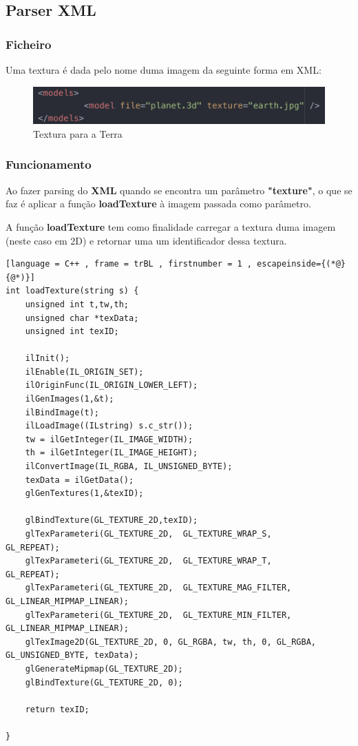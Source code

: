\documentclass[a4paper]{article}
\begin{document}
\subsection{Parser XML}
\label{sec:parsert}

\subsubsection{Ficheiro}
\label{sec:ficheirot}

Uma textura é dada pelo nome duma imagem da seguinte forma em XML:

\begin{figure}[H]
\centering
\includegraphics[scale=0.7]{xml_textura.png}
\caption{Textura para a Terra}
\label{img:textura_terra}
\end{figure}


\subsubsection{Funcionamento}
\label{sec:funcionamentot}

Ao fazer parsing do \textbf{XML} quando se encontra um parâmetro \textbf{"texture"}, o que se faz é aplicar a função \textbf{loadTexture} à imagem passada como parâmetro.

A função \textbf{loadTexture} tem como finalidade carregar a textura duma imagem (neste caso em 2D) e retornar uma um identificador dessa textura.

\begin{lstlisting}[language = C++ , frame = trBL , firstnumber = 1 , escapeinside={(*@}{@*)}]
int loadTexture(string s) {
    unsigned int t,tw,th;
    unsigned char *texData;
    unsigned int texID;

    ilInit();
    ilEnable(IL_ORIGIN_SET);
    ilOriginFunc(IL_ORIGIN_LOWER_LEFT);
    ilGenImages(1,&t);
    ilBindImage(t);
    ilLoadImage((ILstring) s.c_str());
    tw = ilGetInteger(IL_IMAGE_WIDTH);
    th = ilGetInteger(IL_IMAGE_HEIGHT);
    ilConvertImage(IL_RGBA, IL_UNSIGNED_BYTE);
    texData = ilGetData();
    glGenTextures(1,&texID);

    glBindTexture(GL_TEXTURE_2D,texID);
    glTexParameteri(GL_TEXTURE_2D,  GL_TEXTURE_WRAP_S,      GL_REPEAT);
    glTexParameteri(GL_TEXTURE_2D,  GL_TEXTURE_WRAP_T,      GL_REPEAT);
    glTexParameteri(GL_TEXTURE_2D,  GL_TEXTURE_MAG_FILTER,      GL_LINEAR_MIPMAP_LINEAR);
    glTexParameteri(GL_TEXTURE_2D,  GL_TEXTURE_MIN_FILTER, GL_LINEAR_MIPMAP_LINEAR);
    glTexImage2D(GL_TEXTURE_2D, 0, GL_RGBA, tw, th, 0, GL_RGBA, GL_UNSIGNED_BYTE, texData);
    glGenerateMipmap(GL_TEXTURE_2D);
    glBindTexture(GL_TEXTURE_2D, 0);

    return texID;

}
\end{lstlisting}
\end{document}
